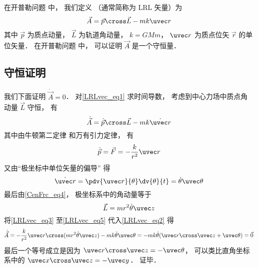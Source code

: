 

在开普勒问题%
中， 我们定义 （通常简称为 LRL 矢量）为
\begin{equation}\label{LRLvec_eq1}
\vec A = \vec p \cross \vec L - mk \uvec r
\end{equation}
其中 $\vec p$ 为质点动量， $\vec L$ 为轨道角动量， $k = GMm$， $\uvec r$ 为质点位矢 $\vec r$ 的单位矢量． 在开普勒问题%
中， 可以证明 $\vec A$ 是一个守恒量．

\subsection{守恒证明}
我们下面证明 $\dot{\vec A} = 0$． 对\autoref{LRLvec_eq1} 求时间导数， 考虑到中心力场中质点角动量 $\vec L$ 守恒， 有
\begin{equation}\label{LRLvec_eq2}
\dot{\vec A} = \dot{\vec p}\cross \vec L  - mk\dot{\uvec r}
\end{equation}
其中由牛顿第二定律 和万有引力定律， 有
\begin{equation}\label{LRLvec_eq3}
\dot{\vec p} = \vec F = - \frac{k}{r^2}\uvec r
\end{equation}
又由“极坐标中单位矢量的偏导” 得
\begin{equation}\label{LRLvec_eq4}
\dot{\uvec r} = \pdv{\uvec r}{\theta} \dv{\theta}{t} = \dot\theta\uvec \theta
\end{equation}
最后由\autoref{CenFrc_eq4}， 极坐标系中的角动量等于
\begin{equation}\label{LRLvec_eq5}
\vec L = mr^2\dot \theta \uvec z
\end{equation}
将\autoref{LRLvec_eq3} 至\autoref{LRLvec_eq5} 代入\autoref{LRLvec_eq2} 得
\begin{equation}
\dot{\vec A} = -\frac{k}{r^2}\uvec r \cross (mr^2\dot\theta\uvec z) - mk\dot\theta\uvec\theta
=-mk\dot\theta (\uvec r\cross \uvec z + \uvec \theta)
= \vec 0
\end{equation}
最后一个等号成立是因为 $\uvec r\cross\uvec z = -\uvec\theta$， 可以类比直角坐标系中的 $\uvec x\cross\uvec z = -\uvec y$． 证毕．

